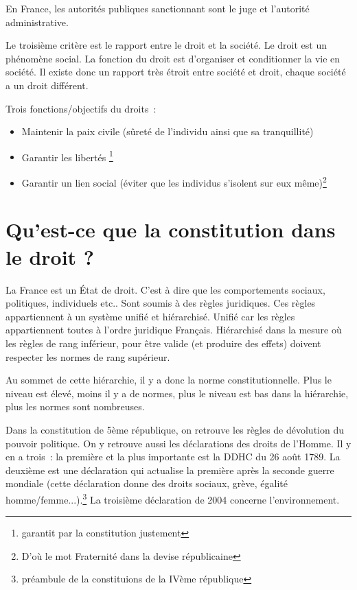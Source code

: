 ﻿\documentclass[12pt, a4paper, openany]{book}
\begin{document}
En France, les autorités publiques sanctionnant sont le juge et l'autorité administrative. \newline

Le troisième critère est le rapport entre le droit et la société. Le droit est un phénomène social. La fonction du droit est d'organiser et conditionner la vie en société. Il existe donc un rapport très étroit entre société et droit, chaque société a un droit différent. \newline

Trois fonctions/objectifs du droits~:
\begin{itemize}
\item Maintenir la paix civile (sûreté de l'individu ainsi que sa tranquillité)
\item Garantir les libertés \footnote{garantit par la constitution justement}
\item Garantir un lien social (éviter que les individus s'isolent sur eux même)\footnote{D'où le mot Fraternité dans la devise républicaine}
\end{itemize}


\section{Qu'est-ce que la constitution dans le droit ?}

La France est un État de droit. C'est à dire que les comportements sociaux, politiques, individuels etc.. Sont soumis à des règles juridiques. Ces règles appartiennent à un système unifié et hiérarchisé. Unifié car les règles appartiennent toutes à l'ordre juridique Français. Hiérarchisé dans la mesure où les règles de rang inférieur, pour être valide (et produire des effets) doivent respecter les normes de rang supérieur.\newline

Au sommet de cette hiérarchie, il y a donc la norme constitutionnelle. Plus le niveau est élevé, moins il y a de normes, plus le niveau est bas dans la hiérarchie, plus les normes sont nombreuses.\newline

Dans la constitution de 5ème république, on retrouve les règles de dévolution du pouvoir politique. On y retrouve aussi les déclarations des droits de l'Homme. Il y en a trois~: la première et la plus importante est la DDHC du 26 août 1789. La deuxième est une déclaration qui actualise la première après la seconde guerre mondiale (cette déclaration donne des droits sociaux, grève, égalité homme/femme...).\footnote{préambule de la constituions de la IVème république} La troisième déclaration de 2004 concerne l'environnement.
\end{document}
